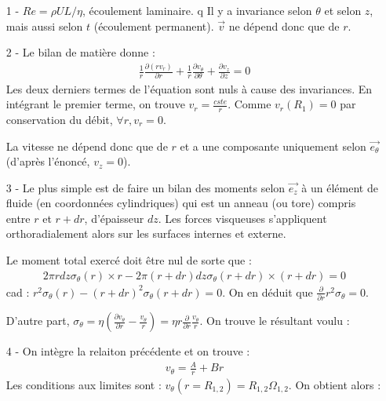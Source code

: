 \documentclass{report}
\begin{document}
\begin{itemize}

\item[1 - ] $Re=\rho UL/\eta$, écoulement laminaire. q Il y a invariance selon $\theta$ et selon $z$, mais aussi selon $t$ (écoulement permanent). $\vec{v}$ ne dépend donc que de $r$. 
\item[2 - ] Le bilan de matière donne : 
\begin{align*}
	\frac{1}{r}\frac{\partial(rv_r)}{\partial r} + \frac{1}{r}\frac{\partial v_\theta}{\partial \theta}+\frac{\partial v_z}{\partial z}=0
\end{align*}
Les deux derniers termes de l'équation sont nuls à cause des invariances. En intégrant le premier terme, on trouve $v_r=\frac{cste}{r}$. Comme $v_r(R_1)=0$ par conservation du débit, $\forall r, v_r=0$.

La vitesse ne dépend donc que de $r$ et a une composante uniquement selon $\vec{e_\theta}$ (d'après l'énoncé, $v_z=0$).

\item[3 - ] Le plus simple est de faire un bilan des moments selon $\vec{e_z}$ à un élément de fluide (en coordonnées cylindriques) qui est un anneau (ou tore) compris entre $r$ et $r+dr$, d'épaisseur $dz$. Les forces visqueuses s'appliquent orthoradialement alors sur les surfaces internes et externe. 

Le moment total exercé doit être nul de sorte que : 
\begin{align*}
	2\pi r dz \sigma_\theta(r)\times r - 2\pi (r+dr) dz \sigma_\theta(r+dr)\times (r+dr) = 0
\end{align*}
cad : $r^2 \sigma_\theta(r) - (r+dr)^2 \sigma_\theta(r+dr) = 0$. On en déduit que $\frac{\partial}{\partial r}r^2\sigma_\theta=0$.

D'autre part, $\sigma_\theta=\eta\left(\frac{\partial v_\theta}{\partial r}-\frac{v_\theta}{r}\right) =\eta r \frac{\partial}{\partial r}\frac{v_\theta}{r} $. On trouve le résultant voulu :

\noindent{}
	
	\item[4 - ] On intègre la relaiton précédente et on trouve :
	\begin{align*}
		v_\theta = \frac{A}{r} + Br
	\end{align*}
	Les conditions aux limites sont : $v_\theta(r=R_{1,2})=R_{1,2}\Omega_{1,2}$. On obtient alors : 
	

\end{itemize}
\end{document}
